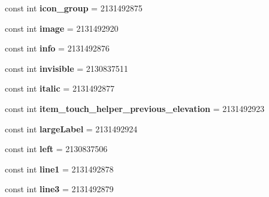\begin{DoxyCompactItemize}
const int {\bfseries icon\+\_\+group} = 2131492875
\item 
\mbox{\label{classst_delivery_1_1_resource_1_1_id_af650bc6b9c43e9249fdc3092dedaeb43}} 
const int {\bfseries image} = 2131492920
\item 
\mbox{\label{classst_delivery_1_1_resource_1_1_id_a50ca064c94cc48247c3ae0d2f4df0643}} 
const int {\bfseries info} = 2131492876
\item 
\mbox{\label{classst_delivery_1_1_resource_1_1_id_a1d05d6fbe923d1c4a1ab06b76fa41e4b}} 
const int {\bfseries invisible} = 2130837511
\item 
\mbox{\label{classst_delivery_1_1_resource_1_1_id_ad04535533cb91d5299cf16d3704532b6}} 
const int {\bfseries italic} = 2131492877
\item 
\mbox{\label{classst_delivery_1_1_resource_1_1_id_aec44ccf82cc599e7ca6c454ac33e53af}} 
const int {\bfseries item\+\_\+touch\+\_\+helper\+\_\+previous\+\_\+elevation} = 2131492923
\item 
\mbox{\label{classst_delivery_1_1_resource_1_1_id_a46cc7f4942d8792cf124053e332012bf}} 
const int {\bfseries large\+Label} = 2131492924
\item 
\mbox{\label{classst_delivery_1_1_resource_1_1_id_af8453a570ea803f9064d316630d81e23}} 
const int {\bfseries left} = 2130837506
\item 
\mbox{\label{classst_delivery_1_1_resource_1_1_id_ac193c0969b087e4ffdd539e3b75f1eaf}} 
const int {\bfseries line1} = 2131492878
\item 
\mbox{\label{classst_delivery_1_1_resource_1_1_id_a5ff7a5fb27abe031716786eedef3df73}} 
const int {\bfseries line3} = 2131492879
\item 
\mbox{\label{classst_delivery_1_1_resource_1_1_id_acdc031908a5b39d6ea89bf1572cbe70f}} 

\end{DoxyCompactItemize}
